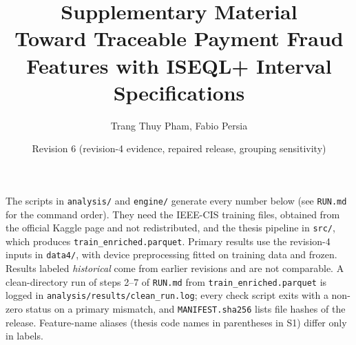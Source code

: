 \documentclass[10pt]{article}
\title{Supplementary Material\\[2pt]\large Toward Traceable Payment Fraud Features with ISEQL+ Interval Specifications}
\author{Trang Thuy Pham, Fabio Persia}
\date{Revision 6 (revision-4 evidence, repaired release, grouping sensitivity)}
\newcommand{\tf}[1]{\texttt{#1}}
\begin{document}
\sloppy
\maketitle

\noindent The scripts in \tf{analysis/} and \tf{engine/} generate every number below (see \tf{RUN.md} for the command order). They need the IEEE-CIS training files, obtained from the official Kaggle page and not redistributed, and the thesis pipeline in \tf{src/}, which produces \tf{train\_enriched.parquet}. Primary results use the revision-4 inputs in \tf{data4/}, with device preprocessing fitted on training data and frozen. Results labeled \emph{historical} come from earlier revisions and are not comparable. A clean-directory run of steps 2--7 of \tf{RUN.md} from \tf{train\_enriched.parquet} is logged in \tf{analysis/results/clean\_run.log}; every check script exits with a non-zero status on a primary mismatch, and \tf{MANIFEST.sha256} lists file hashes of the release. Feature-name aliases (thesis code names in parentheses in S1) differ only in labels.
\end{document}
